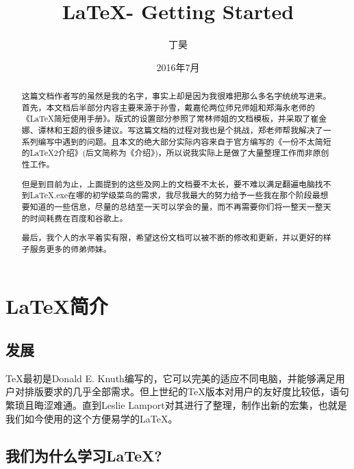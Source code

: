 \documentclass{article}
\begin{document}
\title{\vspace{-2em}\LaTeX  - Getting Started\vspace{0.7em}}
\author{丁昊}%
\date{\vspace{-0.7em}2016年7月\vspace{-0.7em}}%
\maketitle\thispagestyle{fancy}%
\tableofcontents
\newpage


\begin{abstract}
这篇文档作者写的虽然是我的名字，事实上却是因为我很难把那么多名字统统写进来。首先，本文档后半部分内容主要来源于孙雪，戴嘉伦两位师兄师姐和郑海永老师的《\LaTeX 简短使用手册》。版式的设置部分参照了常林师姐的文档模板，并采取了崔金娜、谭林和王超的很多建议。写这篇文档的过程对我也是个挑战，郑老师帮我解决了一系列编写中遇到的问题。且本文的绝大部分实际内容来自于官方编写的《一份不太简短的\LaTeX2介绍》(后文简称为《介绍》)，所以说我实际上是做了大量整理工作而非原创性工作。\par
但是到目前为止，上面提到的这些及网上的文档要不太长，要不难以满足翻遍电脑找不到\LaTeX .exe在哪的初学级菜鸟的需求，我尽我最大的努力给予一些我在那个阶段最想要知道的一些信息，尽量的总结至一天可以学会的量，而不再需要你们将一整天一整天的时间耗费在百度和谷歌上。\par
最后，我个人的水平着实有限，希望这份文档可以被不断的修改和更新，并以更好的样子服务更多的师弟师妹。
\end{abstract}
\newpage


\section{\LaTeX 简介}

\subsection{发展}

\TeX 最初是Donald E. Knuth编写的，它可以完美的适应不同电脑，并能够满足用户对排版要求的几乎全部需求。但上世纪的\TeX 版本对用户的友好度比较低，语句繁琐且晦涩难通。直到Leslie Lamport对其进行了整理，制作出新的宏集，也就是我们如今使用的这个方便易学的\LaTeX 。

\subsection{我们为什么学习\LaTeX ?}
\end{document}
